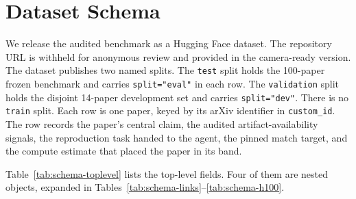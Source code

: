 \section{Dataset Schema}
\label{app:dataset-schema}

We release the audited benchmark as a Hugging Face dataset. The repository URL
is withheld for anonymous review and provided in the camera-ready version. The
dataset publishes two named splits. The \texttt{test} split holds the
100-paper frozen benchmark and carries \texttt{split="eval"} in each row. The
\texttt{validation} split holds the disjoint 14-paper development set and
carries \texttt{split="dev"}. There is no \texttt{train} split. Each row is
one paper, keyed by its arXiv identifier in \texttt{custom\_id}. The row
records the paper's central claim, the audited artifact-availability signals,
the reproduction task handed to the agent, the pinned match target, and the
compute estimate that placed the paper in its band.

Table~\ref{tab:schema-toplevel} lists the top-level fields. Four of them are
nested objects, expanded in
Tables~\ref{tab:schema-links}--\ref{tab:schema-h100}.

